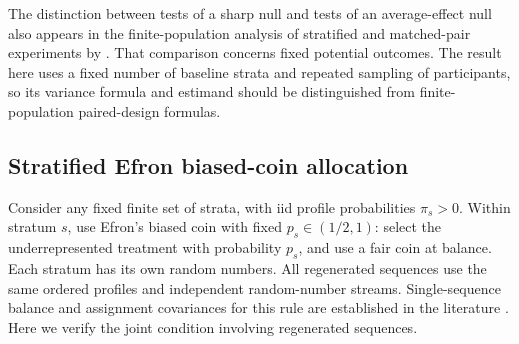 \documentclass[12pt,a4paper]{article}
\theoremstyle{definition}
\theoremstyle{remark}\newtheorem{remark}{Remark}
\numberwithin{equation}{section}
\begin{document}
The distinction between tests of a sharp null and tests of an average-effect null also appears in the finite-population analysis of stratified and matched-pair experiments by \citet{Ding2017}. That comparison concerns fixed potential outcomes. The result here uses a fixed number of baseline strata and repeated sampling of participants, so its variance formula and estimand should be distinguished from finite-population paired-design formulas.

\subsection{Stratified Efron biased-coin allocation}\label{sec:supp-efron}
Consider any fixed finite set of strata, with iid profile probabilities $\pi_s>0$. Within stratum $s$, use Efron's biased coin with fixed $p_s\in(1/2,1)$: select the underrepresented treatment with probability $p_s$, and use a fair coin at balance. Each stratum has its own random numbers. All regenerated sequences use the same ordered profiles and independent random-number streams. Single-sequence balance and assignment covariances for this rule are established in the literature \citep{BugniCanayShaikh2018,MarkaryanRosenberger2010}. Here we verify the joint condition involving regenerated sequences.
\end{document}
